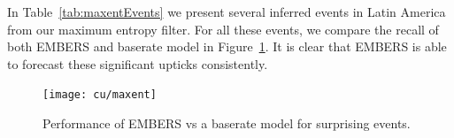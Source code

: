 In Table~\ref{tab:maxentEvents} we present several inferred events in Latin America from our maximum entropy
filter.
For all these events, we compare the recall of both EMBERS and baserate model
in Figure~\ref{fig:maxent}.
It is clear that EMBERS is able to forecast these significant upticks consistently.

\begin{figure} %
\centering
\texttt{[image: cu/maxent]}
\caption{Performance of EMBERS vs a baserate model for surprising events.}
\label{fig:maxent}
\end{figure}
